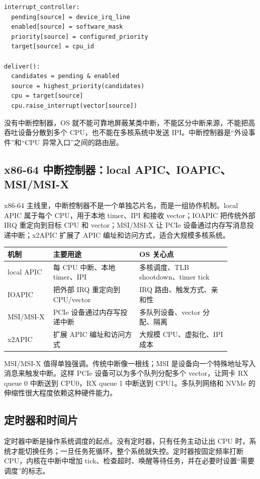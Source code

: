 \begin{lstlisting}
interrupt_controller:
  pending[source] = device_irq_line
  enabled[source] = software_mask
  priority[source] = configured_priority
  target[source] = cpu_id

deliver():
  candidates = pending & enabled
  source = highest_priority(candidates)
  cpu = target[source]
  cpu.raise_interrupt(vector[source])
\end{lstlisting}

没有中断控制器，OS 就不能可靠地屏蔽某类中断，不能区分中断来源，不能把高吞吐设备分散到多个 CPU，也不能在多核系统中发送 IPI。中断控制器是“外设事件”和“CPU 异常入口”之间的路由层。

\subsection{x86-64 中断控制器：local APIC、IOAPIC、MSI/MSI-X}

x86-64 主线里，中断控制器不是一个单独芯片名，而是一组协作机制。local APIC 属于每个 CPU，用于本地 timer、IPI 和接收 vector；IOAPIC 把传统外部 IRQ 重定向到目标 CPU 和 vector；MSI/MSI-X 让 PCIe 设备通过内存写消息投递中断；x2APIC 扩展了 APIC 编址和访问方式，适合大规模多核系统。

\begin{longtable}{p{0.18\linewidth}p{0.34\linewidth}p{0.36\linewidth}}
\toprule
机制 & 主要用途 & OS 关心点 \\
\midrule
local APIC & 每 CPU 中断、本地 timer、IPI & 多核调度、TLB shootdown、timer tick \\
IOAPIC & 把外部 IRQ 重定向到 CPU/vector & IRQ 路由、触发方式、亲和性 \\
MSI/MSI-X & PCIe 设备通过内存写投递中断 & 多队列设备、vector 分配、隔离 \\
x2APIC & 扩展 APIC 编址和访问方式 & 大规模 CPU、虚拟化、IPI 成本 \\
\bottomrule
\end{longtable}

MSI/MSI-X 值得单独强调。传统中断像一根线；MSI 是设备向一个特殊地址写入消息来触发中断。这样 PCIe 设备可以为多个队列分配多个 vector，让网卡 RX queue 0 中断送到 CPU0，RX queue 1 中断送到 CPU1。多队列网络和 NVMe 的伸缩性很大程度依赖这种硬件能力。

\subsection{定时器和时间片}

定时器中断是操作系统调度的起点。没有定时器，只有任务主动让出 CPU 时，系统才能切换任务；一旦任务死循环，整个系统就失控。定时器按固定频率打断 CPU，内核在中断中增加 tick、检查超时、唤醒等待任务，并在必要时设置“需要调度”的标志。

